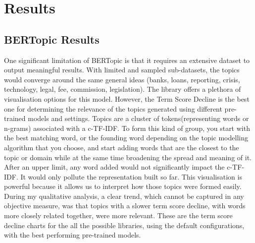 \documentclass[12pt,MSc,a4paper,oneside]{muthesis}
\begin{document}
\chapter{Results}

\section{BERTopic Results}
One significant limitation of BERTopic is that it requires an extensive dataset to output meaningful results. With limited and sampled sub-datasets, the topics would converge around the same general ideas (banks, loans, reporting, crisis, technology, legal, fee, commission, legislation).
The library offers a plethora of visualisation options for this model. However, the Term Score Decline is the best one for determining the relevance of the topics generated using different pre-trained models and settings. Topics are a cluster of tokens(representing words or n-grams) associated with a c-TF-IDF. To form this kind of group, you start with the best matching word, or the founding word depending on the topic modelling algorithm that you choose, and start adding words that are the closest to the topic or domain while at the same time broadening the spread and meaning of it. After an upper limit, any word added would not significantly impact the c-TF-IDF. It would only pollute the representation built so far. This visualisation is powerful because it allows us to interpret how those topics were formed easily. During my qualitative analysis, a clear trend, which cannot be captured in any objective measure, was that topics with a slower term score decline, with words more closely related together, were more relevant.
These are the term score decline charts for the all the possible libraries, using the default configurations, with the best performing pre-trained models.
\end{document}
